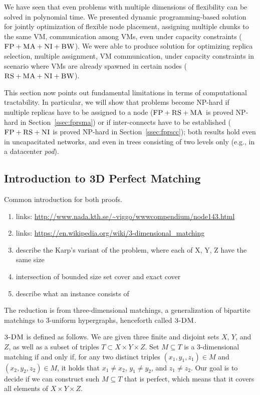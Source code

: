 We have seen that even problems with multiple dimensions of
flexibility can be solved in polynomial time. We presented dynamic programming-based solution for
jointly optimization of flexible node placement, assigning multiple
chunks to the same VM, communication among VMs, even under capacity
constraints ($\textsc{FP}+\textsc{MA}+\textsc{NI}+\textsc{BW}$). We were able to produce solution for optimizing replica selection,
multiple assignment, VM communication, under capacity constraints in
scenario where VMs are already spawned in certain nodes ($\textsc{RS}+\textsc{MA}+\textsc{NI}+\textsc{BW}$).



This section now points out fundamental
limitations in terms of computational tractability. In particular, we
will show that problems become NP-hard if multiple replicas have to be
assigned to a node ($\textsc{FP}+\textsc{RS}+\textsc{MA}$ is proved NP-hard in
Section~\ref{ssec:fprsma}) or if inter-connects have to be established
($\textsc{FP}+\textsc{RS}+\textsc{NI}$ is proved NP-hard in Section~\ref{ssec:fprscc}); both
results hold even in uncapacitated networks, and even in trees
consisting of two levels only (e.g., in a datacenter \emph{pod}).

\subsection{Introduction to 3D Perfect Matching}

Common introduction for both proofs.

\begin{enumerate}
\item links: \url{http://www.nada.kth.se/~viggo/wwwcompendium/node143.html}
\item links: \url{https://en.wikipedia.org/wiki/3-dimensional_matching}
\item describe the Karp's variant of the problem, where each of X, Y, Z have the same size
\item intersection of bounded size set cover and exact cover
\item describe what an instance consists of
\end{enumerate}

The reduction is from three-dimensional matchings, a generalization of bipartite matchings
to 3-uniform hypergraphs, henceforth called
$\textsc{3-DM}$.~\cite{3dmatch}

$\textsc{3-DM}$ is defined as follows. We are given three finite and disjoint sets $X$, $Y$, and $Z$,
as well as a subset of triples $T\subset X \times Y \times Z$.
Set $M \subseteq T$ is a 3-dimensional matching if and only if,
for any two distinct triples $(x_1, y_1, z_1) \in M$ and $(x_2, y_2, z_2) \in M$,
it holds that $x_1\neq x_2$, $y_1\neq y_2$, and $z_1\neq z_2$. Our goal is to
decide if we can construct such $M \subseteq T$ that is perfect, which means that it covers all elements of $X \times Y \times Z$.


